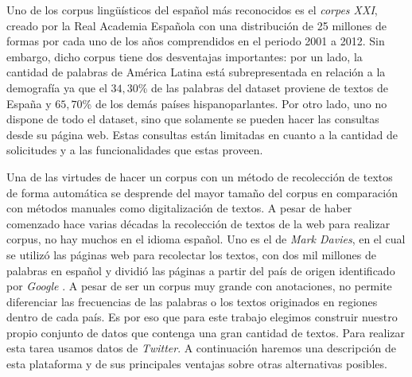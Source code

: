 Uno de los corpus lingüísticos del español más reconocidos es el \emph{corpes XXI}\cite{espanolabanco}, creado por la Real Academia Española con una distribución de 25 millones de formas por cada uno de los años comprendidos en el periodo 2001 
a 2012. Sin embargo, dicho corpus tiene dos desventajas importantes: por un
lado, la cantidad de palabras de América Latina está subrepresentada en relación a la demografía ya que el $34,30$\% de las palabras del dataset proviene de textos de España y $65,70$\% de los demás países hispanoparlantes. Por otro lado, uno no dispone de todo el dataset, sino que solamente se pueden hacer las consultas desde su página web. Estas consultas están limitadas en cuanto a la cantidad de solicitudes y a las funcionalidades que estas proveen.

Una de las virtudes de hacer un corpus con un método de recolección de textos de forma automática se desprende del mayor tamaño del corpus en comparación con métodos manuales como digitalización de textos. A pesar de haber comenzado hace varias décadas la recolección de textos de la web para realizar corpus, no hay muchos en el idioma español.
Uno es el de \textit{Mark Davies}, en el cual se utilizó las páginas web para recolectar los textos, con dos mil millones de palabras en español y dividió las páginas a partir del país de origen identificado por \textit{Google} \cite{davies2015}. A pesar de ser un corpus muy grande con anotaciones, no permite diferenciar las frecuencias de las palabras o los textos originados en regiones dentro de cada país. Es por eso que para este trabajo elegimos construir nuestro propio conjunto de datos que contenga una gran cantidad de textos. Para realizar esta tarea usamos datos de \textit{Twitter}. A continuación haremos una descripción de esta plataforma y de sus principales ventajas sobre otras alternativas posibles.



